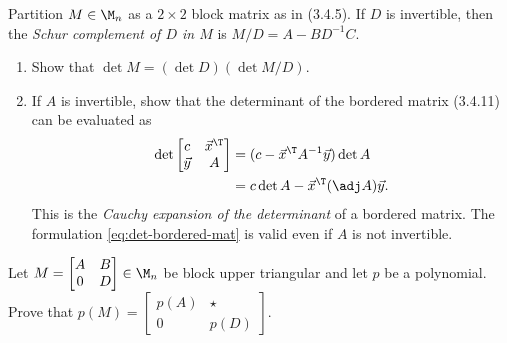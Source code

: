 \documentclass{homework}
\begin{document}
\begin{problem}[P.3.7]
  Partition \(M \in \M_n\) as a \(2\times 2\) block matrix
  as in (3.4.5).  If \(D\) is invertible, then the \emph{Schur
    complement of \(D\) in \(M\)} is \(M/D = A - BD^{-1} C\).
  \begin{enumerate}
  \item Show that \(\det M = (\det D)(\det M/D)\).

    \begin{solution}
    \end{solution}

  \item If \(A\) is invertible, show that the determinant of the
    bordered matrix (3.4.11) can be evaluated as
    \begin{align}
      \det
      \begin{bmatrix}
        c      & \vec x^\T \\
        \vec y & A
      \end{bmatrix}
               &= (c - \vec x^\T A^{-1} \vec y) \det A \nonumber \\
               &= c \det A - \vec x^\T (\adj A) \vec y. \label{eq:det-bordered-mat}
    \end{align}
    This is the \emph{Cauchy expansion of the determinant} of a
    bordered matrix.  The formulation \eqref{eq:det-bordered-mat} is
    valid even if \(A\) is not invertible.

    \begin{solution}
    \end{solution}

  \end{enumerate}
\end{problem}

\begin{problem}[P.3.9]
  Let \(M = \begin{bmatrix}A&B\\0&D\end{bmatrix} \in \M_n\)
  be block upper triangular and let \(p\) be a polynomial.  Prove that
  \(p(M) = \begin{bmatrix}p(A)&\star\\0&p(D)\end{bmatrix}\).

  \begin{solution}
  \end{solution}

\end{problem}
\end{document}
